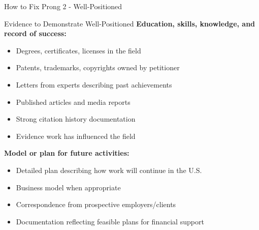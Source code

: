 \documentclass[11pt]{beamer}
\begin{document}
	\begin{frame}{How to Fix Prong 2 - Well-Positioned}
		\scriptsize
		\begin{block}{Evidence to Demonstrate Well-Positioned}
			\textbf{Education, skills, knowledge, and record of success:}
			\begin{itemize}
				\item Degrees, certificates, licenses in the field
				\item Patents, trademarks, copyrights owned by petitioner
				\item Letters from experts describing past achievements
				\item Published articles and media reports
				\item Strong citation history documentation
				\item Evidence work has influenced the field
			\end{itemize}
			\textbf{Model or plan for future activities:}
			\begin{itemize}
				\item Detailed plan describing how work will continue in the U.S.
				\item Business model when appropriate
				\item Correspondence from prospective employers/clients
				\item Documentation reflecting feasible plans for financial support
			\end{itemize}
		\end{block}
	\end{frame}
	
	
\end{document}
